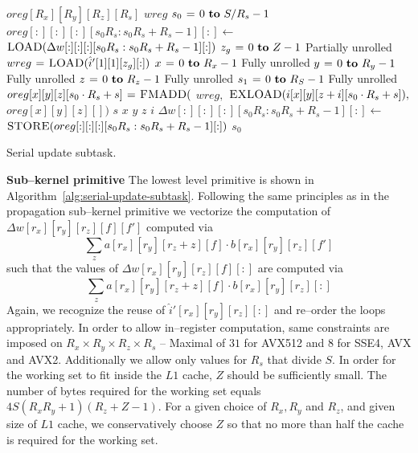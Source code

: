   \begin{algorithm}
    {\footnotesize
      \begin{codebox}
        \li {} $oreg[R_x][R_y][R_z][R_s]$
        \li {} $wreg$
        \li \For $s_0 \gets 0 \To S/R_s - 1$
        \li \Do $oreg[:][:][:][s_0R_s:s_0R_s+R_s-1][:] \gets$
        \li   \Do $\textnormal{\scshape LOAD}(\Delta w[:][:][:][s_0R_s:s_0R_s+R_s-1][:])$
        \End
        \li \For $z_g \gets 0 \To Z-1$ \Comment Partially unrolled
        \li   \Do $wreg \mathrel{\hspace{1pt}=\hspace{1pt}} \textnormal{\scshape LOAD}(\hat{i}'[1][1][z_g][:])$
        \li   \For $x \gets 0 \To R_x-1$ \Comment Fully unrolled
        \li   \Do \For $y \gets 0 \To R_y-1$  \Comment Fully unrolled
        \li   \Do \For $z \gets 0 \To R_z-1$  \Comment Fully unrolled
        \li   \Do \For $s_1 \gets 0 \To R_S-1$   \Comment Fully unrolled
        \li   \Do $oreg[x][y][z][s_0 \cdot R_s + s] \mathrel{\hspace{1pt}=\hspace{1pt}} \textnormal{\scshape FMADD}($
        \li   \Do $wreg,$
        \li       $\textnormal{\scshape EXLOAD}(i[x][y][z+i][s_0 \cdot R_s + s]),$
        \li       $oreg[x][y][z][])$
        \End
        \End \li {} $s$
        \End \li {} $x$
        \End \li {} $y$
        \End \li {} $z$
        \End \li {} $i$
        \li $\Delta w[:][:][:][s_0R_s:s_0R_s+R_s-1][:] \gets$
        \li \Do $\textnormal{\scshape STORE}(oreg[:][:][:][s_0R_s:s_0R_s+R_s-1][:])$
        \End
        \End \li {} $s_0$
      \end{codebox}
    \caption{Serial update subtask.}
    \label{alg:serial-update-subtask}
    }
  \end{algorithm}

  {\bf Sub--kernel primitive} \quad The lowest level primitive is
  shown in Algorithm~\ref{alg:serial-update-subtask}.  Following the
  same principles as in the propagation sub--kernel primitive we
  vectorize the computation of $\Delta w[r_x][r_y][r_z][f][f']$ computed
  via {\small
  \[
  \sum_{z}
  a[r_x][r_y][r_z+z][f] \cdot b[r_x][r_y][r_z][f']
  \]
  } such that the values of $\Delta w[r_x][r_y][r_z][f][:]$ are computed
  via {\small
  \[
  \sum_{z}
  a[r_x][r_y][r_z+z][f] \cdot b[r_x][r_y][r_z][:]
  \]
  } Again, we recognize the reuse of $\hat{i}'[r_x][r_y][r_z][:]$ and
  re--order the loops appropriately.  In order to allow in--register
  computation, same constraints are imposed on $R_x \times R_y \times
  R_z \times R_s$ -- Maximal of $31$ for AVX512 and $8$ for SSE4, AVX
  and AVX2.  Additionally we allow only values for $R_s$ that divide
  $S$.  In order for the working set to fit inside the $L1$ cache, $Z$
  should be sufficiently small.  The number of bytes required for the
  working set equals $4S(R_xR_y+1)(R_z+Z-1)$.  For a given choice of
  $R_x, R_y$ and $R_z$, and given size of $L1$ cache, we
  conservatively choose $Z$ so that no more than half the cache is
  required for the working set.

